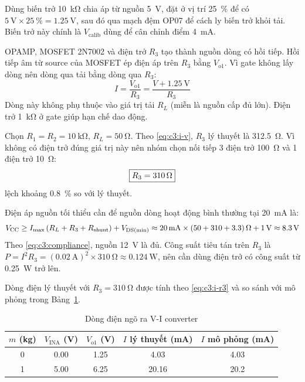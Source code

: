 Dùng biến trở \qty{10}{\kilo\ohm} chia áp từ nguồn \qty{+5}{\volt}, đặt ở vị trí \qty{25}{\percent} để có
$\qty{5}{\volt} \times \qty{25}{\percent} = \qty{1.25}{\volt}$, sau đó qua mạch đệm OP07 để cách ly biến
trở khỏi tải. Biến trở này chính là $V_{\mathrm{calib}}$ dùng để cân chỉnh điểm \qty{4}{\milli\ampere}.

OPAMP, MOSFET 2N7002 và điện trở $R_3$ tạo thành nguồn dòng có hồi tiếp. Hồi tiếp âm từ source của MOSFET
ép điện áp trên $R_3$ bằng $V_{\mathrm{o1}}$. Vì gate không lấy dòng nên dòng qua tải bằng dòng qua $R_3$:
\begin{equation}
    I = \frac{V_{\mathrm{o1}}}{R_3} = \frac{V + \qty{1.25}{\volt}}{R_3}
    \label{eq:c3:i-r3}
\end{equation}
Dòng này không phụ thuộc vào giá trị tải $R_L$ (miễn là nguồn cấp đủ lớn). Điện trở \qty{1}{\kilo\ohm} ở
gate giúp hạn chế dao động.

Chọn $R_1 = R_2 = \qty{10}{\kilo\ohm}$, $R_L = \qty{50}{\ohm}$. Theo \eqref{eq:c3:i-v}, $R_3$ lý thuyết là
\qty{312.5}{\ohm}. Vì không có điện trở đúng giá trị này nên nhóm chọn nối tiếp 3 điện trở \qty{100}{\ohm} và
1 điện trở \qty{10}{\ohm}:
\[
    \boxed{R_3 = \qty{310}{\ohm}}
\]
lệch khoảng \qty{0.8}{\percent} so với lý thuyết.

Điện áp nguồn tối thiểu cần để nguồn dòng hoạt động bình thường tại \qty{20}{\milli\ampere} là:
\begin{equation}
    V_{\mathrm{CC}} \geq I_{\max}\left(R_L + R_3 + \Rshunt\right) + V_{\mathrm{DS(min)}}
    \approx \qty{20}{\milli\ampere} \times (50 + 310 + 3.3)\,\unit{\ohm} + \qty{1}{\volt} \approx \qty{8.3}{\volt}
    \label{eq:c3:compliance}
\end{equation}
Theo \eqref{eq:c3:compliance}, nguồn \qty{12}{\volt} là đủ. Công suất tiêu tán trên $R_3$ là
$P = I^2 R_3 = (\qty{0.02}{\ampere})^2 \times \qty{310}{\ohm} \approx \qty{0.124}{\watt}$, nên cần dùng điện
trở có công suất từ \qty{0.25}{\watt} trở lên.

Dòng điện lý thuyết với $R_3 = \qty{310}{\ohm}$ được tính theo \eqref{eq:c3:i-r3} và so sánh với mô phỏng trong
Bảng~\ref{tab:c3:vi-dong-dien}.

\begin{table}[H]
    \centering
    \caption{Dòng điện ngõ ra V-I converter}
    \label{tab:c3:vi-dong-dien}
    \renewcommand{\arraystretch}{1.3}
    \begin{tabular}{|c|c|c|c|c|}
        \hline
        \textbf{$m$ (\unit{\kilo\gram})} & \textbf{$V_{\mathrm{INA}}$ (\unit{\volt})} &
        \textbf{$V_{\mathrm{o1}}$ (\unit{\volt})} & \textbf{$I$ lý thuyết (\unit{\milli\ampere})} &
        \textbf{$I$ mô phỏng (\unit{\milli\ampere})} \\ \hline
        0 & 0.00 & 1.25 & 4.03  & 4.03 \\ \hline
        1 & 5.00 & 6.25 & 20.16 & 20.2 \\ \hline
    \end{tabular}
\end{table}

